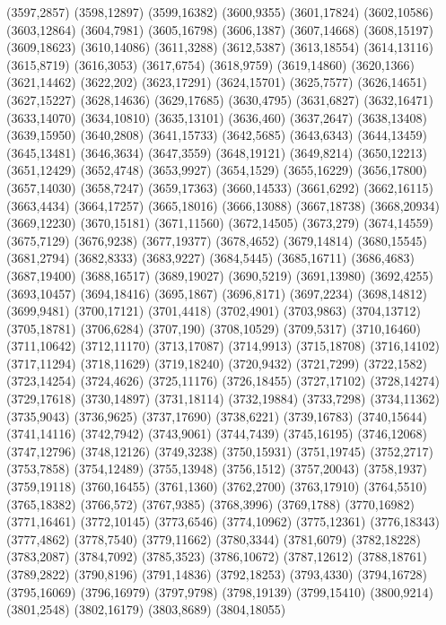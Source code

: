 (3597,2857)
(3598,12897)
(3599,16382)
(3600,9355)
(3601,17824)
(3602,10586)
(3603,12864)
(3604,7981)
(3605,16798)
(3606,1387)
(3607,14668)
(3608,15197)
(3609,18623)
(3610,14086)
(3611,3288)
(3612,5387)
(3613,18554)
(3614,13116)
(3615,8719)
(3616,3053)
(3617,6754)
(3618,9759)
(3619,14860)
(3620,1366)
(3621,14462)
(3622,202)
(3623,17291)
(3624,15701)
(3625,7577)
(3626,14651)
(3627,15227)
(3628,14636)
(3629,17685)
(3630,4795)
(3631,6827)
(3632,16471)
(3633,14070)
(3634,10810)
(3635,13101)
(3636,460)
(3637,2647)
(3638,13408)
(3639,15950)
(3640,2808)
(3641,15733)
(3642,5685)
(3643,6343)
(3644,13459)
(3645,13481)
(3646,3634)
(3647,3559)
(3648,19121)
(3649,8214)
(3650,12213)
(3651,12429)
(3652,4748)
(3653,9927)
(3654,1529)
(3655,16229)
(3656,17800)
(3657,14030)
(3658,7247)
(3659,17363)
(3660,14533)
(3661,6292)
(3662,16115)
(3663,4434)
(3664,17257)
(3665,18016)
(3666,13088)
(3667,18738)
(3668,20934)
(3669,12230)
(3670,15181)
(3671,11560)
(3672,14505)
(3673,279)
(3674,14559)
(3675,7129)
(3676,9238)
(3677,19377)
(3678,4652)
(3679,14814)
(3680,15545)
(3681,2794)
(3682,8333)
(3683,9227)
(3684,5445)
(3685,16711)
(3686,4683)
(3687,19400)
(3688,16517)
(3689,19027)
(3690,5219)
(3691,13980)
(3692,4255)
(3693,10457)
(3694,18416)
(3695,1867)
(3696,8171)
(3697,2234)
(3698,14812)
(3699,9481)
(3700,17121)
(3701,4418)
(3702,4901)
(3703,9863)
(3704,13712)
(3705,18781)
(3706,6284)
(3707,190)
(3708,10529)
(3709,5317)
(3710,16460)
(3711,10642)
(3712,11170)
(3713,17087)
(3714,9913)
(3715,18708)
(3716,14102)
(3717,11294)
(3718,11629)
(3719,18240)
(3720,9432)
(3721,7299)
(3722,1582)
(3723,14254)
(3724,4626)
(3725,11176)
(3726,18455)
(3727,17102)
(3728,14274)
(3729,17618)
(3730,14897)
(3731,18114)
(3732,19884)
(3733,7298)
(3734,11362)
(3735,9043)
(3736,9625)
(3737,17690)
(3738,6221)
(3739,16783)
(3740,15644)
(3741,14116)
(3742,7942)
(3743,9061)
(3744,7439)
(3745,16195)
(3746,12068)
(3747,12796)
(3748,12126)
(3749,3238)
(3750,15931)
(3751,19745)
(3752,2717)
(3753,7858)
(3754,12489)
(3755,13948)
(3756,1512)
(3757,20043)
(3758,1937)
(3759,19118)
(3760,16455)
(3761,1360)
(3762,2700)
(3763,17910)
(3764,5510)
(3765,18382)
(3766,572)
(3767,9385)
(3768,3996)
(3769,1788)
(3770,16982)
(3771,16461)
(3772,10145)
(3773,6546)
(3774,10962)
(3775,12361)
(3776,18343)
(3777,4862)
(3778,7540)
(3779,11662)
(3780,3344)
(3781,6079)
(3782,18228)
(3783,2087)
(3784,7092)
(3785,3523)
(3786,10672)
(3787,12612)
(3788,18761)
(3789,2822)
(3790,8196)
(3791,14836)
(3792,18253)
(3793,4330)
(3794,16728)
(3795,16069)
(3796,16979)
(3797,9798)
(3798,19139)
(3799,15410)
(3800,9214)
(3801,2548)
(3802,16179)
(3803,8689)
(3804,18055)
